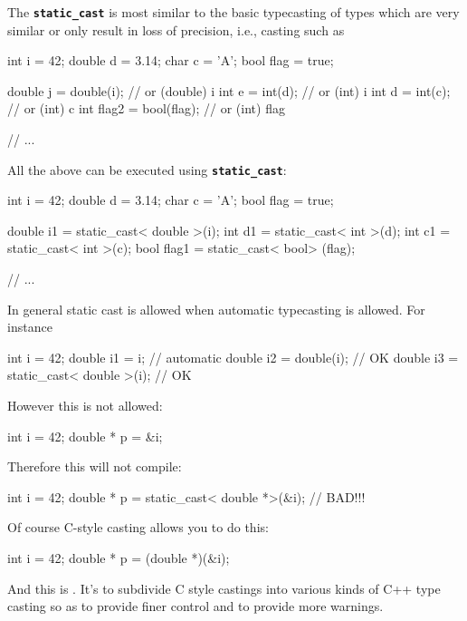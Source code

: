 \newpage{}

The \texttt{\textbf{static\_cast}} is most similar to the basic
typecasting of types which are very similar or only result in loss of
precision, i.e., casting such as
\begin{console}
int i = 42;
double d = 3.14;
char c = 'A';
bool flag = true;

double j = double(i);        // or (double) i
int e = int(d);              // or (int) i
int d = int(c);              // or (int) c
int flag2 = bool(flag);      // or (int) flag

// ...
\end{console}
All the above can be executed using \textbf{\texttt{static\_cast}}:

\begin{console}
int i = 42;
double d = 3.14;
char c = 'A';
bool flag = true;

double i1 = static_cast< double >(i);
int d1 = static_cast< int >(d);
int c1 = static_cast< int >(c);
bool flag1 = static_cast< bool> (flag);

// ...
\end{console}

In general static cast is allowed when automatic typecasting is allowed.
For instance

\begin{console}
int i = 42;
double i1 = i;                        // automatic
double i2 = double(i);                // OK
double i3 = static_cast< double >(i); // OK
\end{console}

However this is not allowed:

\begin{console}
int i = 42;
double * p = &i;
\end{console}

Therefore this will not compile:

\begin{console}
int i = 42;
double * p = static_cast< double *>(&i); // BAD!!!
\end{console}

Of course C-style casting allows you to do this:

\begin{console}
int i = 42;
double * p = (double *)(&i);
\end{console}

And this is . It's to subdivide C style castings into various kinds of C++ type casting so as to provide finer control and to provide more warnings.

